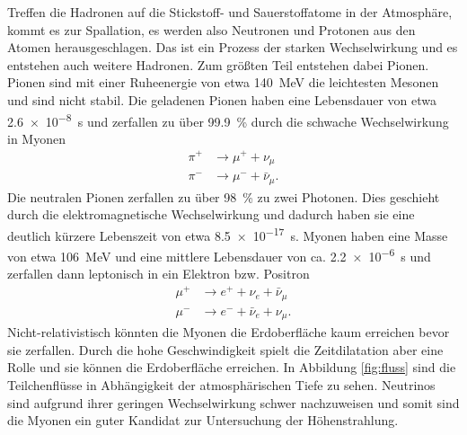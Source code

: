 Treffen die Hadronen auf die Stickstoff- und Sauerstoffatome in der Atmosphäre, kommt es zur Spallation, es werden also Neutronen und Protonen aus den Atomen herausgeschlagen. Das ist ein Prozess der starken Wechselwirkung und es entstehen auch weitere Hadronen. Zum größten Teil entstehen dabei Pionen. Pionen\cite{pdg} sind mit einer Ruheenergie von etwa \SI{140}{\mega \electronvolt} die leichtesten Mesonen und sind nicht stabil. Die geladenen Pionen haben eine Lebensdauer von etwa \SI{2.6e-8}{\second} und zerfallen zu über \SI{99.9}{\percent} durch die schwache Wechselwirkung in Myonen
\begin{align*}
  \pi^+ &\rightarrow \mu^+ + \nu_\mu\\
  \pi^- &\rightarrow \mu^- + \bar{\nu}_\mu.
\end{align*}
Die neutralen Pionen zerfallen zu über \SI{98}{\percent} zu zwei Photonen. Dies geschieht durch die elektromagnetische Wechselwirkung und dadurch haben sie eine deutlich kürzere Lebenszeit von etwa \SI{8.5e-17}{\second}.
Myonen\cite{pdg} haben eine Masse von etwa \SI{106}{\mega\electronvolt} und eine mittlere Lebensdauer von ca. \SI{2.2e-6}{\second} und zerfallen dann leptonisch in ein Elektron bzw. Positron
\begin{align*}
  \mu^+ &\rightarrow e^++ \nu_e +\bar{\nu}_\mu\\
  \mu^- &\rightarrow e^-+ \bar{\nu}_e +\nu_\mu.
\end{align*}
Nicht-relativistisch könnten die Myonen die Erdoberfläche kaum erreichen bevor sie zerfallen. Durch die hohe Geschwindigkeit spielt die Zeitdilatation aber eine Rolle und sie können die Erdoberfläche erreichen. In Abbildung \ref{fig:fluss} sind die Teilchenflüsse in Abhängigkeit der atmosphärischen Tiefe zu sehen. Neutrinos sind aufgrund ihrer geringen Wechselwirkung schwer nachzuweisen und somit sind die Myonen ein guter Kandidat zur Untersuchung der Höhenstrahlung.   

